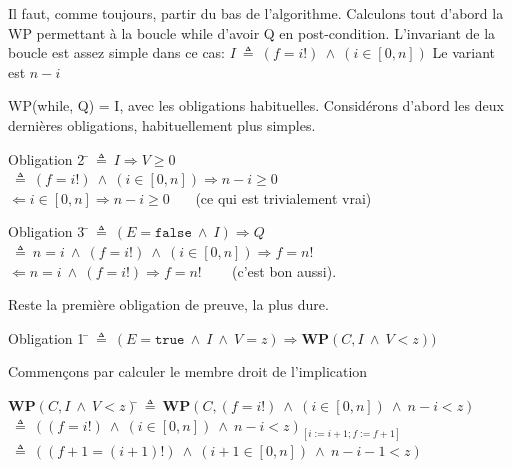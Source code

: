 \documentclass[10pt]{article}\usepackage[nu]{esial}
\begin{document}
\newcommand{\eq}{ \:\triangleq\: }
\newcommand{\ET}{ \:\wedge\: }
\begin{Reponse}
  Il faut, comme toujours, partir du bas de l'algorithme. Calculons tout
  d'abord la WP permettant à la boucle while d'avoir Q en post-condition.
%
  L'invariant de la boucle est assez simple dans ce cas: $I\eq (f=i!)\ET (i\in[0,n])$
  Le variant est $n-i$

  \medskip\noindent 
  WP(while, Q) = I, avec les obligations habituelles. Considérons d'abord les
  deux dernières obligations, habituellement plus simples.

  \medskip\noindent
  \begin{tabbing}
  Obligation 2 \=$\eq I\Rightarrow V\geq 0$\\
  \>$\eq (f=i!)\ET (i\in[0,n])\Rightarrow n-i\geq 0$\\
  \>$\Leftarrow i\in[0,n]\Rightarrow n-i\geq 0$ ~~~(ce qui est trivialement
  vrai)\\
  \end{tabbing}

  \medskip\noindent
  \begin{tabbing}
  Obligation 3 \=$\eq (E=\mathtt{false}\ET I) \Rightarrow Q$\\
  \>$\eq n=i \ET (f=i!)\ET (i\in[0,n]) \Rightarrow f=n!$\\
  \>$\Leftarrow n=i \ET (f=i!) \Rightarrow f=n!$ ~~~ (c'est bon aussi).
  \end{tabbing}
  Reste la première obligation de preuve, la plus dure.

  \medskip\noindent
  \begin{tabbing}
  Obligation 1 \=$\eq (E=\mathtt{true}\ET I\ET V=z) \Rightarrow
    \mathbf{WP}(C,I\ET V<z))$
  \end{tabbing}

  Commençons par calculer le membre droit de l'implication
  \begin{tabbing}
    $\mathbf{WP}(C,I\ET V<z)$\=$\eq \mathbf{WP}(C,(f=i!)\ET
    (i\in[0,n])\ET n-i<z) $\\
    \>$\eq \left((f=i!)\ET (i\in[0,n])\ET n-i<z\right)_{[i:=i+1;f:=f+1]}$\\
    \>$\eq \left((f+1=(i+1)!)\ET (i+1\in[0,n])\ET n-i-1<z\right)$
  \end{tabbing}


\end{Reponse}
\end{document}
